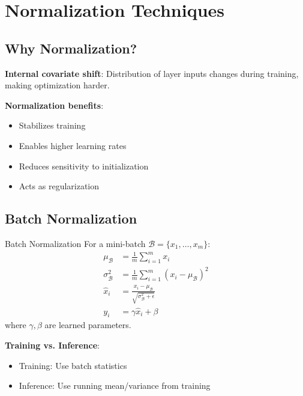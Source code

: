 \section{Normalization Techniques}
\label{sec:normalization}

\subsection{Why Normalization?}

\textbf{Internal covariate shift}: Distribution of layer inputs changes during training, making optimization harder.

\textbf{Normalization benefits}:
\begin{itemize}
    \item Stabilizes training
    \item Enables higher learning rates
    \item Reduces sensitivity to initialization
    \item Acts as regularization
\end{itemize}

\subsection{Batch Normalization}

\begin{mathresult}{Batch Normalization}
For a mini-batch $\mathcal{B} = \{x_1, \ldots, x_m\}$:
\begin{align}
\mu_\mathcal{B} &= \frac{1}{m}\sum_{i=1}^m x_i \\
\sigma_\mathcal{B}^2 &= \frac{1}{m}\sum_{i=1}^m (x_i - \mu_\mathcal{B})^2 \\
\hat{x}_i &= \frac{x_i - \mu_\mathcal{B}}{\sqrt{\sigma_\mathcal{B}^2 + \epsilon}} \\
y_i &= \gamma \hat{x}_i + \beta
\end{align}
where $\gamma, \beta$ are learned parameters.
\end{mathresult}

\textbf{Training vs. Inference}:
\begin{itemize}
    \item Training: Use batch statistics
    \item Inference: Use running mean/variance from training
\end{itemize}

